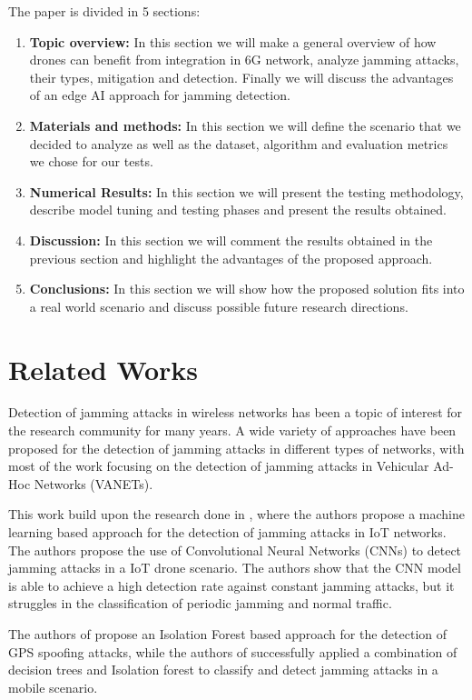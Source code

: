 \documentclass[futureinternet,article,submit,pdftex,moreauthors]{Definitions/mdpi}
\begin{document}
The paper is divided in 5 sections: 
\begin{enumerate}
	\item \textbf{Topic overview:} In this section we will make a general overview of how drones can benefit from integration in 6G network, analyze jamming attacks, their types, mitigation and detection. Finally we will discuss the advantages of an edge AI approach for jamming detection. 
	\item \textbf{Materials and methods:} In this section we will define the scenario that we decided to analyze as well as the dataset, algorithm and evaluation metrics we chose for our tests. 
	\item \textbf{Numerical Results:} In this section we will present the testing methodology, describe model tuning and testing phases and present the results obtained. 
	\item \textbf{Discussion:} In this section we will comment the results obtained in the previous section and highlight the advantages of the proposed approach. 
	\item \textbf{Conclusions:} In this section we will show how the proposed solution fits into a real world scenario and discuss possible future research directions.
\end{enumerate}

\section{Related Works}

Detection of jamming attacks in wireless networks has been a topic of interest for the research community for many years. A wide variety of approaches have been proposed for the detection of jamming attacks 
in different types of networks, with most of the work focusing on the detection of jamming attacks in Vehicular Ad-Hoc Networks (VANETs)\cite{VANETsAI-Lyamin}.

This work build upon the research done in \cite{JammingDetectionIoT-Hussain}, where the authors propose a machine learning based approach for the detection of jamming attacks in IoT networks. 
The authors propose the use of Convolutional Neural Networks (CNNs) to detect jamming attacks in a IoT drone scenario. The authors show that the CNN model is able to achieve a high detection rate against constant jamming attacks, but it 
struggles in the classification of periodic jamming and normal traffic. 

The authors of \cite{GPSSpoofingDetection-Zuo} propose an Isolation Forest based approach for the detection of GPS spoofing attacks, while the authors of \cite{HybridJammingDetection-Hong} successfully applied a combination of decision trees and Isolation forest to classify 
and detect jamming attacks in a mobile scenario. 
\end{document}

